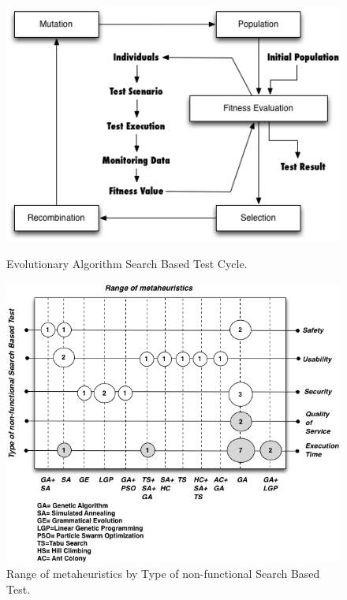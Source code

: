 \documentclass{bmcart}
\begin{document}
\begin{backmatter}
\begin{figure}[h]
\begin{minipage}{.5\textwidth}
\centering
\includegraphics{./images/evolutionary.png}
\caption{Evolutionary Algorithm Search Based Test Cycle\citep{Baars2011}. }
\label{fig:evocycle}
\end{minipage}
\begin{minipage}{.5\textwidth}
\centering
\includegraphics{./images/metaheuristics.png}
\caption{Range of metaheuristics by Type of non-functional Search Based Test\citep{Afzal2009a}. }
\label{fig:metabykind}
\end{minipage}
\end{figure}


\end{backmatter}
\end{document}
